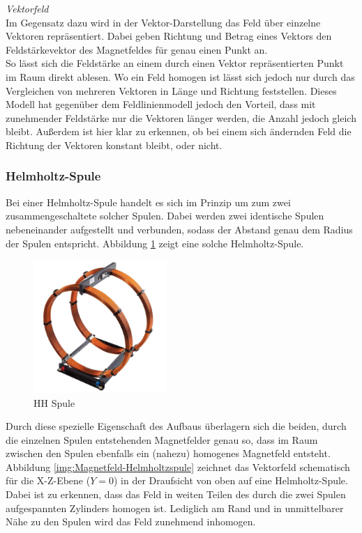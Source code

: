 \textit{Vektorfeld}\\
Im Gegensatz dazu wird in der Vektor-Darstellung das Feld über einzelne Vektoren repräsentiert. Dabei geben Richtung und Betrag eines Vektors den Feldstärkevektor des Magnetfeldes für genau einen Punkt an.\\
So lässt sich die Feldstärke an einem durch einen Vektor repräsentierten Punkt im Raum direkt ablesen. Wo ein Feld homogen ist lässt sich jedoch nur durch das Vergleichen von mehreren Vektoren in Länge und Richtung feststellen. Dieses Modell hat gegenüber dem Feldlinienmodell jedoch den Vorteil, dass mit zunehmender Feldstärke nur die Vektoren länger werden, die Anzahl jedoch gleich bleibt. Außerdem ist hier klar zu erkennen, ob bei einem sich ändernden Feld die Richtung der Vektoren konstant bleibt, oder nicht.

\subsubsection{Helmholtz-Spule}
Bei einer Helmholtz-Spule handelt es sich im Prinzip um zum zwei zusammengeschaltete solcher Spulen. Dabei werden zwei identische Spulen nebeneinander aufgestellt und verbunden, sodass der Abstand genau dem Radius der Spulen entspricht. Abbildung \ref{img:Helmholtz} zeigt eine solche Helmholtz-Spule.\\

\begin{figure}[h!]
	\centering
	\includegraphics[width=0.45\textwidth]{images/Helmholtz.jpg}
	\caption{HH Spule}
	\label{img:Helmholtz}
\end{figure}

Durch diese spezielle Eigenschaft des Aufbaus überlagern sich die beiden, durch die einzelnen Spulen entstehenden Magnetfelder genau so, dass im Raum zwischen den Spulen ebenfalls ein (nahezu) homogenes Magnetfeld entsteht. Abbildung \ref{img:Magnetfeld-Helmholtzspule} zeichnet das Vektorfeld schematisch für die X-Z-Ebene ($Y=0$) in der Draufsicht von oben auf eine Helmholtz-Spule. Dabei ist zu erkennen, dass das Feld in weiten Teilen des durch die zwei Spulen aufgespannten Zylinders homogen ist. Lediglich am Rand und in unmittelbarer Nähe zu den Spulen wird das Feld zunehmend inhomogen.\\

